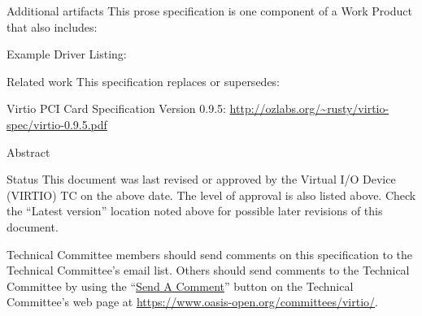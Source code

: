 \begin{titlepage}
\begin{oasistitlesection}{Additional artifacts}
This prose specification is one component of a Work Product that also includes:
\begin{itemize*}
	\item Example Driver Listing: \newline
	\virtiourllistings
\end{itemize*}
\end{oasistitlesection}
\vspace{-0.2in}

\begin{oasistitlesection}{Related work}
This specification replaces or supersedes:
\begin{itemize*}
	\item Virtio PCI Card Specification Version 0.9.5:\newline
	\url{http://ozlabs.org/~rusty/virtio-spec/virtio-0.9.5.pdf}
\end{itemize*}
\end{oasistitlesection}
\vspace{-0.2in}

\vfill\newpage

\begin{oasistitlesection}{Abstract}

\end{oasistitlesection}

\begin{oasistitlesection}{Status}
This document was last revised or approved by the Virtual I/O Device
(VIRTIO) TC on the above date. The level of approval is also listed above. Check the ``Latest version'' location noted above for possible later revisions of this document.

Technical Committee members should send comments on this
specification to the Technical Committee’s email list. Others
should send comments to the Technical Committee by using the
``\href{https://www.oasis-open.org/committees/comments/form.php?wg_abbrev=virtio}{Send
A Comment}'' button on the Technical Committee’s web page at
\url{https://www.oasis-open.org/committees/virtio/}.


\end{oasistitlesection}
\end{titlepage}
